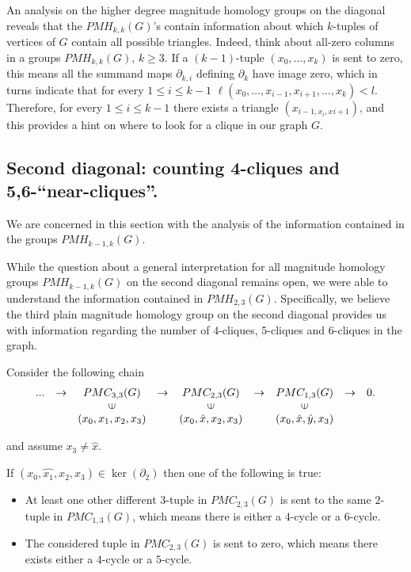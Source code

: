 \documentclass[runningheads]{llncs}
\newcommand{\vin}{\rotatebox[origin=c]{90}{$\in$}}
\begin{document}
An analysis on the higher degree magnitude homology groups on the diagonal reveals that the $PMH_{k,k}(G)$'s contain information about which $k$-tuples of vertices of $G$ contain all possible triangles. 
Indeed, think about all-zero columns in a groups $PMH_{k,k}(G)$, $k \geq 3$.
If a $(k-1)$-tuple $(x_0,\dots,x_k)$ is sent to zero, this means all the summand maps $\partial_{k,i}$ defining $\partial_k$ have image zero, which in turns indicate that for every $1\leq i \leq k-1$ $\ell(x_0,\dots,x_{i-1},x_{i+1},\dots,x_k)<l$.
Therefore, for every $1\leq i \leq k-1$ there exists a triangle $(x_{i-1,x_i,x_{}i+1})$, and this provides a hint on where to look for a clique in our graph $G$.

\subsection{Second diagonal: counting 4-cliques and 5,6-``near-cliques''.}

We are concerned in this section with the analysis of the information contained in the groups $PMH_{k-1,k}(G)$.

While the question about a general interpretation for all magnitude homology groups $PMH_{k-1,k}(G)$ on the second diagonal remains open, we were able to understand the information contained in $PMH_{2,3}(G)$.
Specifically, we believe the third plain magnitude homology group on the second diagonal provides us with information regarding the number of $4$-cliques, $5$-cliques and $6$-cliques in the graph.

Consider the following chain
\begin{equation*}
    \begin{matrix}
    ... &\to & PMC_{3,3}(G)      &\to & PMC_{2,3}(G)            &\to & PMC_{1,3}(G) &\to & 0. \\
        &    & \vin              &    & \vin                    &    & \vin         &    &    \\
        &    & (x_0,x_1,x_2,x_3) &    & (x_0,\hat{x},x_2,x_3) &    & (x_0,\hat{x},\hat{y},x_3) & &
    \end{matrix}
\end{equation*}

and assume $x_3 \neq \hat{x}$.

If $(x_0,\hat{x_1},x_2,x_3) \in \ker(\partial_2)$ then one of the following is true:
\begin{itemize}
    \item At least one other different $3$-tuple in $PMC_{2,3}(G)$ is sent to the same $2$-tuple in $PMC_{1,3}(G)$, which means there is either a $4$-cycle or a $6$-cycle.
    \item The considered tuple in $PMC_{2,3}(G)$ is sent to zero, which means there exists either a $4$-cycle or a $5$-cycle.
\end{itemize}
\end{document}
